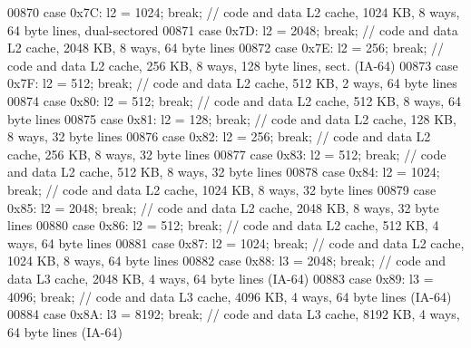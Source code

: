 \begin{DoxyCode}
{00870       \textcolor{keywordflow}{case} 0x7C: l2 = 1024; \textcolor{keywordflow}{break};   \textcolor{comment}{// code and data L2 cache, 1024 KB, 8 ways, 64 byte lines,
       dual-sectored}
00871       \textcolor{keywordflow}{case} 0x7D: l2 = 2048; \textcolor{keywordflow}{break};   \textcolor{comment}{// code and data L2 cache, 2048 KB, 8 ways, 64 byte lines}
00872       \textcolor{keywordflow}{case} 0x7E: l2 = 256; \textcolor{keywordflow}{break};   \textcolor{comment}{// code and data L2 cache, 256 KB, 8 ways, 128 byte lines, sect.
       (IA-64)}
00873       \textcolor{keywordflow}{case} 0x7F: l2 = 512; \textcolor{keywordflow}{break};   \textcolor{comment}{// code and data L2 cache, 512 KB, 2 ways, 64 byte lines}
00874       \textcolor{keywordflow}{case} 0x80: l2 = 512; \textcolor{keywordflow}{break};   \textcolor{comment}{// code and data L2 cache, 512 KB, 8 ways, 64 byte lines}
00875       \textcolor{keywordflow}{case} 0x81: l2 = 128; \textcolor{keywordflow}{break};   \textcolor{comment}{// code and data L2 cache, 128 KB, 8 ways, 32 byte lines}
00876       \textcolor{keywordflow}{case} 0x82: l2 = 256; \textcolor{keywordflow}{break};   \textcolor{comment}{// code and data L2 cache, 256 KB, 8 ways, 32 byte lines}
00877       \textcolor{keywordflow}{case} 0x83: l2 = 512; \textcolor{keywordflow}{break};   \textcolor{comment}{// code and data L2 cache, 512 KB, 8 ways, 32 byte lines}
00878       \textcolor{keywordflow}{case} 0x84: l2 = 1024; \textcolor{keywordflow}{break};   \textcolor{comment}{// code and data L2 cache, 1024 KB, 8 ways, 32 byte lines}
00879       \textcolor{keywordflow}{case} 0x85: l2 = 2048; \textcolor{keywordflow}{break};   \textcolor{comment}{// code and data L2 cache, 2048 KB, 8 ways, 32 byte lines}
00880       \textcolor{keywordflow}{case} 0x86: l2 = 512; \textcolor{keywordflow}{break};   \textcolor{comment}{// code and data L2 cache, 512 KB, 4 ways, 64 byte lines}
00881       \textcolor{keywordflow}{case} 0x87: l2 = 1024; \textcolor{keywordflow}{break};   \textcolor{comment}{// code and data L2 cache, 1024 KB, 8 ways, 64 byte lines}
00882       \textcolor{keywordflow}{case} 0x88: l3 = 2048; \textcolor{keywordflow}{break};   \textcolor{comment}{// code and data L3 cache, 2048 KB, 4 ways, 64 byte lines (IA-64)}
00883       \textcolor{keywordflow}{case} 0x89: l3 = 4096; \textcolor{keywordflow}{break};   \textcolor{comment}{// code and data L3 cache, 4096 KB, 4 ways, 64 byte lines (IA-64)}
00884       \textcolor{keywordflow}{case} 0x8A: l3 = 8192; \textcolor{keywordflow}{break};   \textcolor{comment}{// code and data L3 cache, 8192 KB, 4 ways, 64 byte lines (IA-64)}
}
\end{DoxyCode}
